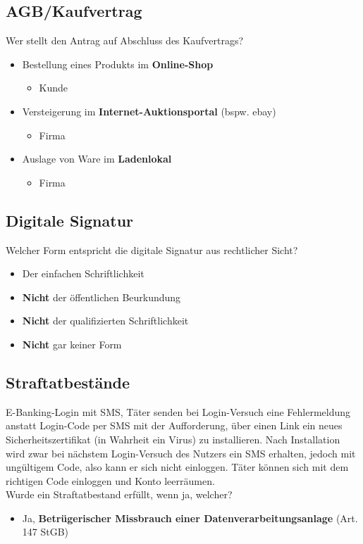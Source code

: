 \subsection{AGB/Kaufvertrag}
Wer stellt den Antrag auf Abschluss des Kaufvertrags?
\begin{itemize}
	\item Bestellung eines Produkts im \textbf{Online-Shop}
	\begin{itemize}
		\item Kunde
	\end{itemize}
	\item Versteigerung im \textbf{Internet-Auktionsportal} (bspw. ebay)
	\begin{itemize}
		\item Firma
	\end{itemize}
	\item Auslage von Ware im \textbf{Ladenlokal}
	\begin{itemize}
		\item Firma
	\end{itemize}
\end{itemize}

\subsection{Digitale Signatur}
Welcher Form entspricht die digitale Signatur aus rechtlicher Sicht?
\begin{itemize}
	\item Der einfachen Schriftlichkeit
	\item \textbf{Nicht} der öffentlichen Beurkundung
	\item \textbf{Nicht} der qualifizierten Schriftlichkeit
	\item \textbf{Nicht} gar keiner Form
\end{itemize}

\subsection{Straftatbestände}
E-Banking-Login mit SMS, Täter senden bei Login-Versuch eine Fehlermeldung anstatt Login-Code per SMS mit der Aufforderung, über einen Link ein neues Sicherheitszertifikat (in Wahrheit ein Virus) zu installieren. Nach Installation wird zwar bei nächstem Login-Versuch des Nutzers ein SMS erhalten, jedoch mit ungültigem Code, also kann er sich nicht einloggen. Täter können sich mit dem richtigen Code einloggen und Konto leerräumen.\\
Wurde ein Straftatbestand erfüllt, wenn ja, welcher?
\begin{itemize}
	\item Ja, \textbf{Betrügerischer Missbrauch einer Datenverarbeitungsanlage} (Art. 147 StGB)
\end{itemize}